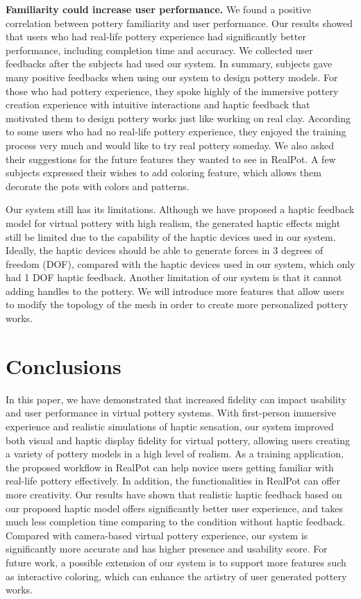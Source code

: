 \documentclass{svjour3}                     %
\begin{document}
{\textbf{Familiarity could increase user performance.}
We found a positive correlation between pottery familiarity and user performance.
%
Our results showed that users who had real-life pottery experience had significantly better performance, including completion time and accuracy.
%
We collected user feedbacks after the subjects had used our system.
In summary, subjects gave many positive feedbacks when using our system to design pottery models.
For those who had pottery experience, they spoke highly of the immersive pottery creation experience with intuitive interactions and haptic feedback that motivated them to design pottery works just like working on real clay.
According to some users who had no real-life pottery experience, they enjoyed the training process very much and would like to try real pottery someday.
We also asked their suggestions for the future features they wanted to see in RealPot.
A few subjects expressed their wishes to add coloring feature, which allows them decorate the pots with colors and patterns.

Our system still has its limitations. Although we have proposed a haptic feedback model for virtual pottery with high realism, the generated haptic effects might still be limited due to the capability of the haptic devices used in our system. Ideally, the haptic devices should be able to generate forces in 3 degrees of freedom (DOF), compared with the haptic devices used in our system, which only had 1 DOF haptic feedback.
%
Another limitation of our system is that it cannot adding handles to the pottery. We will introduce more features that allow users to modify the topology of the mesh in order to create more personalized pottery works.

\section{Conclusions}
\label{sec:conclusion}

In this paper, we have demonstrated that increased fidelity can impact usability and user performance in virtual pottery systems.
With first-person immersive experience and realistic simulations of haptic sensation, our system improved both visual and haptic display fidelity for virtual pottery, allowing users creating a variety of pottery models in a high level of realism.
As a training application, the proposed workflow in RealPot can help novice users getting familiar with real-life pottery effectively. In addition, the functionalities in RealPot can offer more creativity.
%
Our results have shown that realistic haptic feedback based on our proposed haptic model offers significantly better user experience, and takes much less completion time comparing to the condition without haptic feedback.
%
Compared with camera-based virtual pottery experience, our system is significantly more accurate and has higher presence and usability score.
%
For future work, a possible extension of our system is to support more features such as interactive coloring, which can enhance the artistry of user generated pottery works.

}
\end{document}
